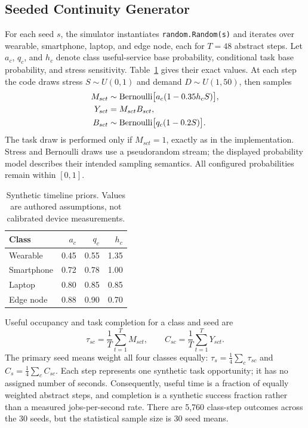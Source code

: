 \subsection{Seeded Continuity Generator}
For each seed $s$, the simulator instantiates \texttt{random.Random(s)} and iterates over wearable, smartphone, laptop, and edge node, each for $T=48$ abstract steps. Let $a_c$, $q_c$, and $h_c$ denote class useful-service base probability, conditional task base probability, and stress sensitivity. Table~\ref{tab:priors} gives their exact values. At each step the code draws stress $S\sim U(0,1)$ and demand $D\sim U(1,50)$, then samples
\begin{align}
M_{sct}&\sim\mathrm{Bernoulli}\big[a_c(1-0.35h_cS)\big],\label{eq:useful}\\
Y_{sct}&=M_{sct}B_{sct},\label{eq:task}\\
B_{sct}&\sim\mathrm{Bernoulli}\big[q_c(1-0.2S)\big].\notag
\end{align}
The task draw is performed only if $M_{sct}=1$, exactly as in the implementation. Stress and Bernoulli draws use a pseudorandom stream; the displayed probability model describes their intended sampling semantics. All configured probabilities remain within $[0,1]$.

\begin{table}[t]\centering\caption{Synthetic timeline priors. Values are authored assumptions, not calibrated device measurements.}\label{tab:priors}\small
\begin{tabular}{lrrr}\toprule
Class & $a_c$ & $q_c$ & $h_c$\\\midrule
Wearable & 0.45 & 0.55 & 1.35\\
Smartphone & 0.72 & 0.78 & 1.00\\
Laptop & 0.80 & 0.85 & 0.85\\
Edge node & 0.88 & 0.90 & 0.70\\\bottomrule
\end{tabular}\end{table}

Useful occupancy and task completion for a class and seed are
\begin{equation}
\tau_{sc}=\frac1T\sum_{t=1}^{T}M_{sct},\qquad
C_{sc}=\frac1T\sum_{t=1}^{T}Y_{sct}.\label{eq:outcomes}
\end{equation}
The primary seed means weight all four classes equally: $\tau_s=\frac14\sum_c\tau_{sc}$ and $C_s=\frac14\sum_c C_{sc}$. Each step represents one synthetic task opportunity; it has no assigned number of seconds. Consequently, useful time is a fraction of equally weighted abstract steps, and completion is a synthetic success fraction rather than a measured jobs-per-second rate. There are 5,760 class-step outcomes across the 30 seeds, but the statistical sample size is 30 seed means.

